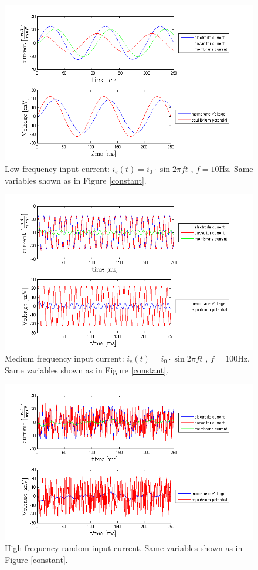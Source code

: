 \documentclass{scrartcl}
\begin{document}
\begin{figure}
\centering
\includegraphics[trim = {1.3cm 0 2cm 0.9cm}, width=\textwidth, clip]{../pics/low}
\caption{\small{Low frequency input current: $i_e(t) = i_0 \cdot \sin{2\pi f t}$ , $f = 10\si{\hertz}$. Same variables shown as in Figure \ref{constant}.}}
\end{figure}

\begin{figure}
\centering
\includegraphics[trim = {1.3cm 0 2cm 0.9cm}, width=\textwidth, clip]{../pics/medium}
\caption{\small{Medium frequency input current: $i_e(t) = i_0 \cdot \sin{2\pi f t}$ , $f = 100\si{\hertz}$. Same variables shown as in Figure \ref{constant}.}}
\end{figure}

\begin{figure}
\centering
\includegraphics[trim = {1.3cm 0 2cm 0.9cm}, width=\textwidth, clip]{../pics/random}
\caption{\small{High frequency random input current. Same variables shown as in Figure \ref{constant}.}}
\end{figure}
\end{document}
